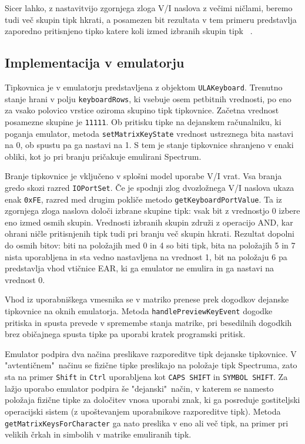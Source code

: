 \documentclass[a4paper, 12pt, openright]{book}
\begin{document}
    Sicer lahko, z nastavitvijo zgornjega zloga V/I naslova z večimi ničlami,
    beremo tudi več skupin tipk hkrati, a posamezen bit rezultata v tem primeru predstavlja
    zaporedno pritisnjeno tipko katere koli izmed izbranih skupin tipk ~\cite{strojnijezikzaprocesorz80,
    zxspectrumbasicprogramming}.

    \subsection{Implementacija v emulatorju}

    Tipkovnica je v emulatorju predstavljena z objektom \texttt{ULAKeyboard}. Trenutno
    stanje hrani v polju \texttt{keyboardRows}, ki vsebuje osem petbitnih vrednosti,
    po eno za vsako polovico vrstice oziroma skupino tipk tipkovnice. Začetna vrednost
    posamezne skupine je \texttt{11111}. Ob pritisku tipke na dejanskem računalniku,
    ki poganja emulator, metoda \texttt{setMatrixKeyState} vrednost ustreznega
    bita nastavi na 0, ob spustu pa ga nastavi na 1. S tem je stanje tipkovnice shranjeno
    v enaki obliki, kot jo pri branju pričakuje emulirani Spectrum.

    Branje tipkovnice je vključeno v splošni model uporabe V/I vrat. Vsa branja gredo
    skozi razred \texttt{IOPortSet}. Če je spodnji zlog dvozložnega V/I naslova ukaza
    enak \texttt{0xFE}, razred med drugim pokliče metodo \texttt{getKeyboardPortValue}.
    Ta iz zgornjega zloga naslova določi izbrane skupine tipk: vsak bit z
    vrednostjo 0 izbere eno izmed osmih skupin. Vrednosti izbranih skupin združi z
    operacijo AND, kar ohrani ničle pritisnjenih tipk tudi pri branju več skupin
    hkrati. Rezultat dopolni do osmih bitov: biti na položajih med 0 in 4 so
    biti tipk, bita na položajih 5 in 7 nista uporabljena in sta vedno nastavljena
    na vrednost 1, bit na položaju 6 pa predstavlja vhod vtičnice EAR, ki ga emulator
    ne emulira in ga nastavi na vrednost 0.

    Vhod iz uporabniškega vmesnika se v matriko prenese prek dogodkov dejanske
    tipkovnice na oknih emulatorja. Metoda \texttt{handlePreviewKeyEvent}
    dogodke pritiska in spusta prevede v spremembe stanja matrike, pri besedilnih
    dogodkih brez običajnega spusta tipke pa uporabi kratek programski pritisk.

    Emulator podpira dva načina preslikave razporeditve tipk dejanske tipkovnice.
    V "avtentičnem"~načinu se fizične tipke preslikajo na položaje tipk
    Spectruma, zato sta na primer \texttt{Shift} in \texttt{Ctrl} uporabljena kot
    \texttt{CAPS SHIFT} in \texttt{SYMBOL SHIFT}. Za lažjo uporabo emulator
    podpira še "dejanski"~način, v katerem se namesto položaja fizične tipke za določitev
    vnosa uporabi znak, ki ga posreduje gostiteljski operacijski sistem (z upoštevanjem
    uporabnikove razporeditve tipk). Metoda \texttt{getMatrixKeysForCharacter}
    ga nato preslika v eno ali več tipk, na primer pri velikih črkah in simbolih v
    matrike emuliranih tipk.
\end{document}
